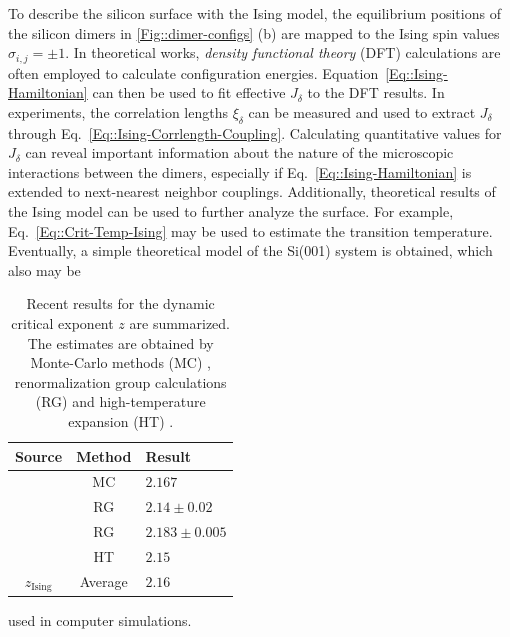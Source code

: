	To describe the silicon surface with the Ising model, the equilibrium positions of the silicon dimers in \autoref{Fig::dimer-configs} (b) are mapped to the Ising spin values $\sigma_{i ,j} =	\pm 1$. In theoretical works, \textit{density functional theory} (DFT) calculations are often employed to calculate configuration energies. Equation~\eqref{Eq::Ising-Hamiltonian} can then be used to fit effective  $J_\delta$ to the DFT results. In experiments, the correlation lengths $\xi_\delta$ can be measured and used to extract $J_\delta$ through Eq.~\eqref{Eq::Ising-Corrlength-Coupling}. Calculating quantitative values for $J_\delta$ can reveal important information about the nature of the microscopic interactions between the dimers, especially if Eq.~\eqref{Eq::Ising-Hamiltonian} is extended to next-nearest neighbor couplings. Additionally, theoretical
%		
	results of the Ising model can be used to further analyze the surface. For example, Eq.~\eqref{Eq::Crit-Temp-Ising} may be used to estimate the transition temperature. Eventually, a simple theoretical model of the Si(001) system is obtained, which also may be 
	\begin{table}
		\centering
		\caption{Recent results for the dynamic critical exponent $z$ are summarized. The estimates are obtained by Monte-Carlo methods (MC) \cite{nightingale2000monte}, renormalization group calculations (RG) \cite{adzhemyan2022dynamic, duclut2017frequency} and high-temperature expansion (HT) \cite{dammann1993dynamical}.}
		\renewcommand{\arraystretch}{1.3}
		\begin{tabular}{c c l}
			Source & Method  & Result \\
			\midrule
			\cite{nightingale2000monte} & MC &  $2.167$ \\
			\cite{adzhemyan2022dynamic} & RG &  $2.14 \pm 0.02$ \\
			\cite{duclut2017frequency} & RG &  $2.183 \pm 0.005$ \\
			\cite{dammann1993dynamical} & HT &  $2.15$ \\
			\bottomrule
			$z_\text{Ising}$ & Average &  $2.16$ \\
		\end{tabular}
		\label{Figure::Ising-z-values}
	\end{table}	
 	used in computer simulations. \\
 	
